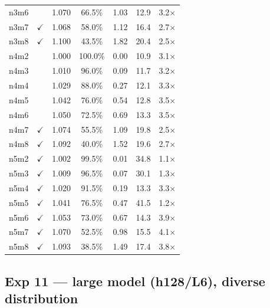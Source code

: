 \documentclass[11pt,a4paper]{article}
\begin{document}
\begin{longtable}{llccccc}
n3m6 &              & 1.070 & 66.5\% & 1.03 & 12.9 & 3.2$\times$ \\
n3m7 & $\checkmark$ & 1.068 & 58.0\% & 1.12 & 16.4 & 2.7$\times$ \\
n3m8 & $\checkmark$ & 1.100 & 43.5\% & 1.82 & 20.4 & 2.5$\times$ \\
n4m2 &              & 1.000 & 100.0\% & 0.00 & 10.9 & 3.1$\times$ \\
n4m3 &              & 1.010 & 96.0\% & 0.09 & 11.7 & 3.2$\times$ \\
n4m4 &              & 1.029 & 88.0\% & 0.27 & 12.1 & 3.3$\times$ \\
n4m5 &              & 1.042 & 76.0\% & 0.54 & 12.8 & 3.5$\times$ \\
n4m6 &              & 1.050 & 72.5\% & 0.69 & 13.3 & 3.5$\times$ \\
n4m7 & $\checkmark$ & 1.074 & 55.5\% & 1.09 & 19.8 & 2.5$\times$ \\
n4m8 & $\checkmark$ & 1.092 & 40.0\% & 1.52 & 19.6 & 2.7$\times$ \\
n5m2 & $\checkmark$ & 1.002 & 99.5\% & 0.01 & 34.8 & 1.1$\times$ \\
n5m3 & $\checkmark$ & 1.009 & 96.5\% & 0.07 & 30.1 & 1.3$\times$ \\
n5m4 & $\checkmark$ & 1.020 & 91.5\% & 0.19 & 13.3 & 3.3$\times$ \\
n5m5 & $\checkmark$ & 1.041 & 76.5\% & 0.47 & 41.5 & 1.2$\times$ \\
n5m6 & $\checkmark$ & 1.053 & 73.0\% & 0.67 & 14.3 & 3.9$\times$ \\
n5m7 & $\checkmark$ & 1.070 & 52.5\% & 0.98 & 15.5 & 4.1$\times$ \\
n5m8 & $\checkmark$ & 1.093 & 38.5\% & 1.49 & 17.4 & 3.8$\times$ \\
\end{longtable}

\subsection{Exp 11 --- large model (h128/L6), diverse distribution}
\label{app:exp11}
\end{document}
